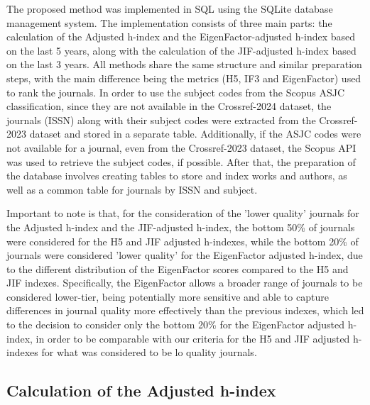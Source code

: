The proposed method was implemented in SQL using the SQLite database management
system. The implementation consists of three main parts: the calculation of the
Adjusted h-index and the EigenFactor-adjusted h-index based on the last 5
years, along with the calculation of the JIF-adjusted h-index based on the last
3 years. All methods share the same structure and similar preparation steps,
with the main difference being the metrics (H5, IF3 and EigenFactor) used to
rank the journals. In order to use the subject codes from the Scopus ASJC
classification, since they are not available in the Crossref-2024 dataset, the
journals (ISSN) along with their subject codes were extracted from the
Crossref-2023 dataset and stored in a separate table. Additionally, if the ASJC
codes were not available for a journal, even from the Crossref-2023 dataset,
the Scopus API was used to retrieve the subject codes, if possible. After that,
the preparation of the database involves creating tables to store and index
works and authors, as well as a common table for journals by ISSN and subject.

Important to note is that, for the consideration of the 'lower quality'
journals for the Adjusted h-index and the JIF-adjusted h-index, the bottom 50\%
of journals were considered for the H5 and JIF adjusted h-indexes, while the
bottom 20\% of journals were considered 'lower quality' for the EigenFactor
adjusted h-index, due to the different distribution of the EigenFactor scores
compared to the H5 and JIF indexes. Specifically, the EigenFactor allows a
broader range of journals to be considered lower-tier, being potentially more
sensitive and able to capture differences in journal quality more effectively
than the previous indexes, which led to the decision to consider only the
bottom 20\% for the EigenFactor adjusted h-index, in order to be comparable
with our criteria for the H5 and JIF adjusted h-indexes for what was considered
to be lo quality journals.

\subsection{Calculation of the Adjusted h-index}

